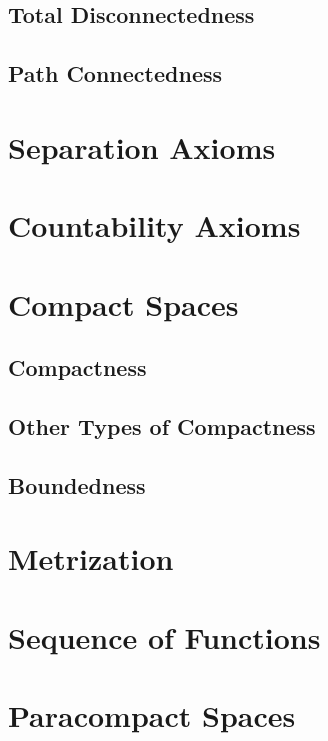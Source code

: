     \subsection{Total Disconnectedness}
    
    \subsection{Path Connectedness}
    
    \section{Separation Axioms}
    
    \section{Countability Axioms}
    
    \section{Compact Spaces}
    
    \subsection{Compactness}
    
    \subsection{Other Types of Compactness}
    
    \subsection{Boundedness}
    
    \section{Metrization}
    
    \section{Sequence of Functions}
    
    \section{Paracompact Spaces}

